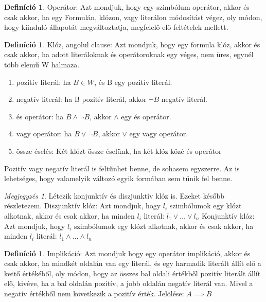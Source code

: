 \documentclass[
]{thesis-ekf}
\theoremstyle{definition}
\newtheorem{definicio}[tetel]{Definíció}
\theoremstyle{remark}
\newtheorem{megjegyzes}[tetel]{Megjegyzés}
\begin{document}
	\begin{definicio}
		Operátor: Azt mondjuk, hogy egy szimbólum operátor, akkor és csak akkor, ha egy Formulán, klózon, vagy literálon módosítást végez, oly módon, hogy kiinduló állapotát megváltoztatja, megfelelő elő feltételek mellett.
	\end{definicio}

	\begin{definicio}
		Klóz, angolul clause: Azt mondjuk, hogy egy formula klóz, akkor és csak akkor, ha adott literáloknak és operátoroknak egy véges, nem üres, egynél több elemű W halmaza.
		\begin{enumerate}
			\item pozitív literál: ha $ B\in W $, és B egy pozitív literál.
			\item negatív literál: ha B pozitív literál, akkor $\neg B $ negatív literál.
			\item és operátor: ha $ B \wedge \neg B $, akkor $\wedge$ egy és operátor.
			\item vagy operátor: ha $ B \vee \neg B $, akkor $\vee$ egy vagy operátor.
			\item össze éselés: Két klózt össze éselünk, ha két klóz közé és operátor
		\end{enumerate}
		Pozitív vagy negatív literál is feltűnhet benne, de sohasem egyszerre. Az is lehetséges, hogy valamelyik változó egyik formában sem tűnik fel benne.
	\end{definicio}

	\begin{megjegyzes}
		Létezik konjunktív és diszjunktív klóz is. Ezeket később részletezem.
		Diszjunktív klóz: Azt mondjuk, hogy $ l_{i} $ szimbólumok egy klózt alkotnak, akkor és csak akkor, ha minden $ l_{i} $ literál: $ l_{1}\vee\dots\vee l_{n} $
		Konjunktív klóz: Azt mondjuk, hogy $ l_{i} $ szimbólumok egy klózt alkotnak, akkor és csak akkor, ha minden $ l_{i} $ literál: $ l_{1}\wedge\dots\wedge l_{n} $
	\end{megjegyzes}

	\begin{definicio}
		Implikáció: Azt mondjuk hogy egy operátor implikáció, akkor és csak akkor, ha mindkét oldalán van egy literál, és egy harmadik literált állít elő a kettő értékéből, oly módon, hogy az összes bal oldali értékből pozitív literált állít elő, kivéve, ha a bal oldalán pozitív, a jobb oldalán negatív literál van.
		Mivel a negatív értékből nem következik a pozitív érték. Jelölése: $ A \implies B $
	\end{definicio}
\end{document}
